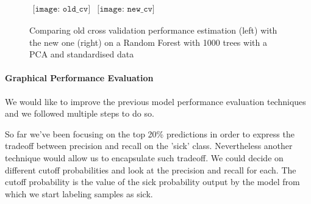\begin{figure}[h]
\begin{center}$
\begin{array}{cc}
\texttt{[image: old\_cv]} &
\texttt{[image: new\_cv]} 
\end{array}$
\end{center}
\caption{\label{CV_comparison} Comparing old cross validation performance estimation (left) with the new one (right) on a Random Forest with 1000 trees with a PCA and standardised data}
\end{figure}


\paragraph{Graphical Performance Evaluation}
We would like to improve the previous model performance evaluation techniques and we followed multiple steps to do so.

So far we've been focusing on the top 20\% predictions in order to express the tradeoff between precision and recall on the 'sick' class. Nevertheless another technique would allow us to encapsulate such tradeoff. We could decide on different cutoff probabilities and look at the precision and recall for each. The cutoff probability is the value of the sick probability output by the model from which we start labeling samples as sick.

